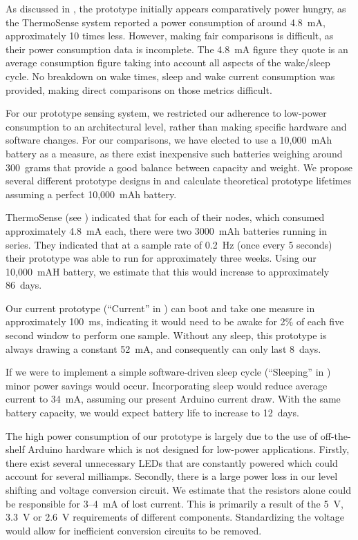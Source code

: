 \documentclass[../thesis/thesis.tex]{subfiles}
\begin{document}
As discussed in , the prototype initially appears comparatively power hungry, as the ThermoSense system reported a power consumption of around 4.8~mA, approximately 10 times less. However, making fair comparisons is difficult, as their power consumption data is incomplete. The 4.8~mA figure they quote is an average consumption figure taking into account all aspects of the wake/sleep cycle. No breakdown on wake times, sleep and wake current consumption was provided, making direct comparisons on those metrics difficult.

For our prototype sensing system, we restricted our adherence to low-power consumption to an architectural level, rather than making specific hardware and software changes. For our comparisons, we have elected to use a 10,000~mAh battery as a measure, as there exist inexpensive such batteries weighing around 300~grams \cite{AdafruitBattery} that provide a good balance between capacity and weight. We propose several different prototype designs in  and calculate theoretical prototype lifetimes assuming a perfect 10,000~mAh battery.

ThermoSense (see ) indicated that for each of their nodes, which consumed approximately 4.8~mA each, there were two 3000~mAh batteries running in series. They indicated that at a sample rate of 0.2~Hz (once every 5 seconds) their prototype was able to run for approximately three weeks. Using our 10,000~mAH battery, we estimate that this would increase to approximately 86~days.

Our current prototype (``Current'' in ) can boot and take one measure in approximately 100~ms, indicating it would need to be awake for 2\% of each five second window to perform one sample. Without any sleep, this prototype is always drawing a constant 52~mA, and consequently can only last 8~days.

If we were to implement a simple software-driven sleep cycle (``Sleeping'' in ) minor power savings would occur. Incorporating sleep would reduce average current to 34~mA, assuming our present Arduino current draw. With the same battery capacity, we would expect battery life to increase to 12~days.

The high power consumption of our prototype is largely due to the use of off-the-shelf Arduino hardware which is not designed for low-power applications. Firstly, there exist several unnecessary LEDs that are constantly powered which could account for several milliamps. Secondly, there is a large power loss in our level shifting and voltage conversion circuit. We estimate that the resistors alone could be responsible for 3--4~mA of lost current. This is primarily a result of the 5~V, 3.3~V or 2.6~V requirements of different components. Standardizing the voltage would allow for inefficient conversion circuits to be removed.
\end{document}
